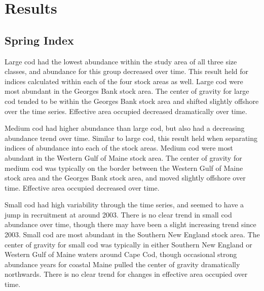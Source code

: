 \documentclass[
]{article}
\begin{document}
\hypertarget{results}{%
\section{Results}\label{results}}

\hypertarget{spring-index}{%
\subsection{Spring Index}\label{spring-index}}

Large cod had the lowest abundance within the study area of all three size classes, and abundance for this group decreased over time. This result held for indices calculated within each of the four stock areas as well. Large cod were most abundant in the Georges Bank stock area. The center of gravity for large cod tended to be within the Georges Bank stock area and shifted slightly offshore over the time series. Effective area occupied decreased dramatically over time.

Medium cod had higher abundance than large cod, but also had a decreasing abundance trend over time. Similar to large cod, this result held when separating indices of abundance into each of the stock areas. Medium cod were most abundant in the Western Gulf of Maine stock area. The center of gravity for medium cod was typically on the border between the Western Gulf of Maine stock area and the Georges Bank stock area, and moved slightly offshore over time. Effective area occupied decreased over time.

Small cod had high variability through the time series, and seemed to have a jump in recruitment at around 2003. There is no clear trend in small cod abundance over time, though there may have been a slight increasing trend since 2003. Small cod are most abundant in the Southern New England stock area. The center of gravity for small cod was typically in either Southern New England or Western Gulf of Maine waters around Cape Cod, though occasional strong abundance years for coastal Maine pulled the center of gravity dramatically northwards. There is no clear trend for changes in effective area occupied over time.
\end{document}
